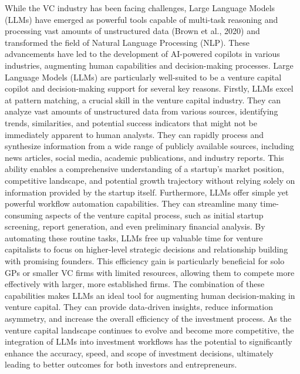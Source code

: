 \documentclass[a4paper, oneside]{discothesis}
\begin{document}
While the VC industry has been facing challenges, Large Language Models (LLMs) have emerged as powerful tools capable of multi-task reasoning and processing vast amounts of
unstructured data (Brown et al., 2020) and transformed the field of Natural Language Processing (NLP). These advancements have led to the development of
AI-powered copilots in various industries, augmenting human capabilities and decision-making processes.
 Large Language Models (LLMs) are particularly well-suited to be a venture capital copilot and decision-making support for several key reasons. 
Firstly, LLMs excel at pattern matching, a crucial skill in the venture capital industry. They can analyze vast amounts of unstructured data from various sources, identifying trends, similarities, and potential success indicators that might not be immediately apparent to human analysts.
They can rapidly process and synthesize information from a wide range of publicly available sources, including news articles, social media, academic publications, and industry reports. This ability enables a comprehensive understanding of a startup's market position, competitive landscape, and potential growth trajectory without relying solely on information provided by the startup itself.
Furthermore, LLMs offer simple yet powerful workflow automation capabilities. They can streamline many time-consuming aspects of the venture capital process, such as initial startup screening, report generation, and even preliminary financial analysis. By automating these routine tasks, LLMs free up valuable time for venture capitalists to focus on higher-level strategic decisions and relationship building with promising founders. This efficiency gain is particularly beneficial for solo GPs or smaller VC firms with limited resources, allowing them to compete more effectively with larger, more established firms.
The combination of these capabilities makes LLMs an ideal tool for augmenting human decision-making in venture capital. They can provide data-driven insights, reduce information asymmetry, and increase the overall efficiency of the investment process. As the venture capital landscape continues to evolve and become more competitive, the integration of LLMs into investment workflows has the potential to significantly enhance the accuracy, speed, and scope of investment decisions, ultimately leading to better outcomes for both investors and entrepreneurs.
\end{document}
